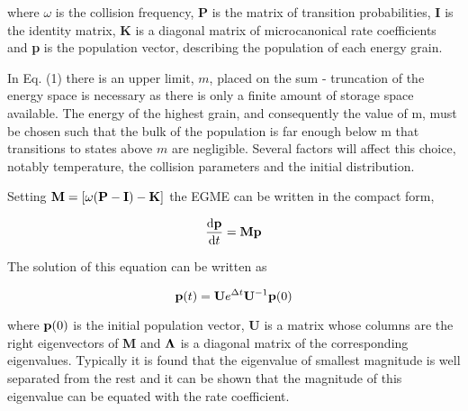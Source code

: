 where $\omega$ is the collision frequency, {\bf P} is the matrix of transition probabilities, {\bf I} is the identity matrix, {\bf K} is a diagonal matrix of microcanonical rate coefficients and {\bf p} is the population vector, describing the population of each energy grain.

In Eq. (1) there is an upper limit, $m$, placed on the sum - truncation of the energy space is necessary as there is only a finite amount of storage space available. The energy of the highest grain, and consequently the value of m, must be chosen such that the bulk of the population is far enough below m that transitions to states above $m$ are negligible. Several factors will affect this choice, notably temperature, the collision parameters and the initial distribution.

Setting ${\bf M} = \left[ {\omega ({\bf P} - {\bf I}) - {\bf K}} \right]$ the EGME can be written in the compact form,

\begin{equation}
\frac{{{\rm d}{\bf p}}}{{{\rm d}t}} = {\bf Mp}
\end{equation}

The solution of this equation can be written as

\[
{\bf p}(t) = {\bf U}e^{\Delta t} {\bf U}^{ - 1} {\bf p}(0)
\]


where ${\bf p}(0)$ is the initial population vector, {\bf U} is a matrix whose columns are the right eigenvectors of {\bf M} and ${\bf \Lambda}$ is a diagonal matrix of the corresponding eigenvalues. Typically it is found that the eigenvalue of smallest magnitude is well separated from the rest and it can be shown that the magnitude of this eigenvalue can be equated with the rate coefficient.

